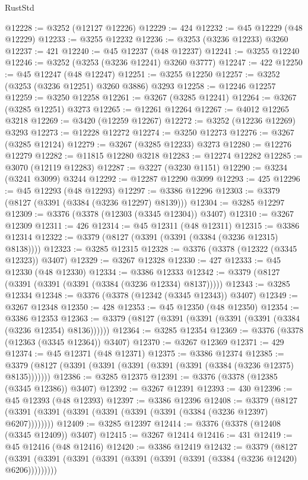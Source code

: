 \begin{lexlean}{RustStd}
\begin{coremodule}
{\begin{coremodule}
{{{{{{{{{{{{{{{{{{{{{{{{{{{{{{{{{{{{{{{@12228 := @3252 (@12127 @12226)
@12229 := 424
@12232 := @45 @12229 (@48 @12229)
@12233 := @3255 @12232
@12236 := @3253 (@3236 @12233) @3260
@12237 := 421
@12240 := @45 @12237 (@48 @12237)
@12241 := @3255 @12240
@12246 := @3252 (@3253 (@3236 @12241) @3260 @3777)
@12247 := 422
@12250 := @45 @12247 (@48 @12247)
@12251 := @3255 @12250
@12257 := @3252 (@3253 (@3236 @12251) @3260 @3886) @3293
@12258 := @12246 @12257
@12259 := @3250 @12258
@12261 := @3267 (@3285 @12241)
@12264 := @3267 (@3285 @12251) @3273
@12265 := @12261 @12264
@12267 := @4012 @12265 @3218
@12269 := @3420 (@12259 @12267)
@12272 := @3252 (@12236 @12269) @3293
@12273 := @12228 @12272
@12274 := @3250 @12273
@12276 := @3267 (@3285 @12124)
@12279 := @3267 (@3285 @12233) @3273
@12280 := @12276 @12279
@12282 := @11815 @12280 @3218
@12283 := @12274 @12282
@12285 := @3070 (@12119 @12283)
@12287 := @3227 (@3230 @1151)
@12290 := @3234 (@3241 @3099) @3244
@12292 := @12287 @12290 @3099
@12293 := 425
@12296 := @45 @12293 (@48 @12293)
@12297 := @3386 @12296
@12303 := @3379 (@8127 (@3391 (@3384 (@3236 @12297) @8139)))
@12304 := @3285 @12297
@12309 := @3376 (@3378 (@12303 (@3345 @12304)) @3407)
@12310 := @3267 @12309
@12311 := 426
@12314 := @45 @12311 (@48 @12311)
@12315 := @3386 @12314
@12322 := @3379 (@8127 (@3391 (@3391 (@3384 (@3236 @12315) @8138))))
@12323 := @3285 @12315
@12328 := @3376 (@3378 (@12322 (@3345 @12323)) @3407)
@12329 := @3267 @12328
@12330 := 427
@12333 := @45 @12330 (@48 @12330)
@12334 := @3386 @12333
@12342 := @3379 (@8127 (@3391 (@3391 (@3391 (@3384 (@3236 @12334) @8137)))))
@12343 := @3285 @12334
@12348 := @3376 (@3378 (@12342 (@3345 @12343)) @3407)
@12349 := @3267 @12348
@12350 := 428
@12353 := @45 @12350 (@48 @12350)
@12354 := @3386 @12353
@12363 := @3379 (@8127 (@3391 (@3391 (@3391 (@3391 (@3384 (@3236 @12354) @8136))))))
@12364 := @3285 @12354
@12369 := @3376 (@3378 (@12363 (@3345 @12364)) @3407)
@12370 := @3267 @12369
@12371 := 429
@12374 := @45 @12371 (@48 @12371)
@12375 := @3386 @12374
@12385 := @3379 (@8127 (@3391 (@3391 (@3391 (@3391 (@3391 (@3384 (@3236 @12375) @8135)))))))
@12386 := @3285 @12375
@12391 := @3376 (@3378 (@12385 (@3345 @12386)) @3407)
@12392 := @3267 @12391
@12393 := 430
@12396 := @45 @12393 (@48 @12393)
@12397 := @3386 @12396
@12408 := @3379 (@8127 (@3391 (@3391 (@3391 (@3391 (@3391 (@3391 (@3384 (@3236 @12397) @6207))))))))
@12409 := @3285 @12397
@12414 := @3376 (@3378 (@12408 (@3345 @12409)) @3407)
@12415 := @3267 @12414
@12416 := 431
@12419 := @45 @12416 (@48 @12416)
@12420 := @3386 @12419
@12432 := @3379
    (@8127 (@3391 (@3391 (@3391 (@3391 (@3391 (@3391 (@3391 (@3384 (@3236 @12420) @6206)))))))))
}}}}}}}}}}}}}}}}}}}}}}}}}}}}}}}}}}}}}}}
\end{coremodule}}
\end{coremodule}
\end{lexlean}
